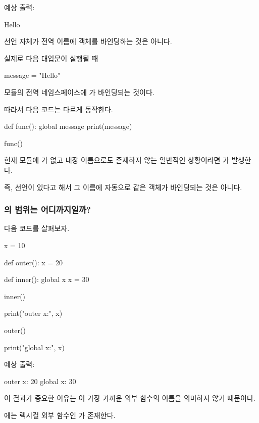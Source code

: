 예상 출력:

\begin{dhkzsh}
Hello
\end{dhkzsh}

 선언 자체가 전역 이름에 객체를 바인딩하는 것은 아니다.

실제로 다음 대입문이 실행될 때

\begin{dhkcode}
message = "Hello"
\end{dhkcode}

모듈의 전역 네임스페이스에 가 바인딩되는 것이다.

따라서 다음 코드는 다르게 동작한다.

\begin{dhkcode}
def func():
    global message
    print(message)

func()
\end{dhkcode}

현재 모듈에 가 없고 내장 이름으로도 존재하지 않는 일반적인 상황이라면 가 발생한다.

즉,  선언이 있다고 해서 그 이름에 자동으로  같은 객체가 바인딩되는 것은 아니다.

\subsubsection{의 범위는 어디까지일까?}

다음 코드를 살펴보자.

\begin{dhkcode}
x = 10

def outer():
    x = 20

    def inner():
        global x
        x = 30

    inner()

    print("outer x:", x)

outer()

print("global x:", x)
\end{dhkcode}

예상 출력:

\begin{dhkzsh}
outer x: 20
global x: 30
\end{dhkzsh}

이 결과가 중요한 이유는 이 가장 가까운 외부 함수의 이름을 의미하지 않기 때문이다.

에는 렉시컬 외부 함수인 가 존재한다.


